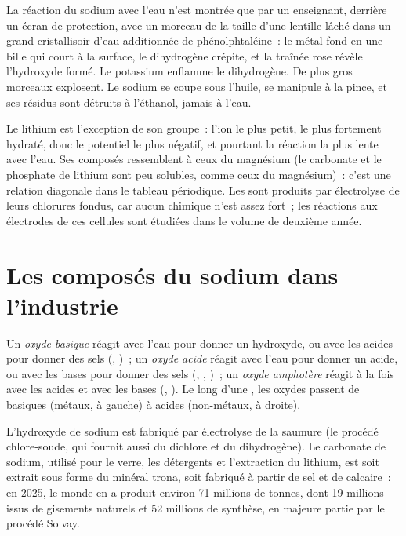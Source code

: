 \begin{inthelab}
La réaction du sodium avec l'eau n'est montrée que par un enseignant,
derrière un écran de protection, avec un morceau de la taille d'une
lentille lâché dans un grand cristallisoir d'eau additionnée de
phénolphtaléine~: le métal fond en une bille qui court à la surface, le
dihydrogène crépite, et la traînée rose révèle l'hydroxyde formé. Le
potassium enflamme le dihydrogène. De plus gros morceaux explosent. Le
sodium se coupe sous l'huile, se manipule à la pince, et ses résidus
sont détruits à l'éthanol, jamais à l'eau.
\end{inthelab}

Le lithium est l'exception de son groupe~: l'ion le plus petit, le plus
fortement hydraté, donc le potentiel le plus négatif, et pourtant la
réaction la plus lente avec l'eau. Ses composés ressemblent à ceux du
magnésium (le carbonate et le phosphate de lithium sont peu solubles,
comme ceux du magnésium)~: c'est une relation diagonale dans le tableau
périodique. Les  sont produits par électrolyse de leurs
chlorures fondus, car aucun  chimique n'est assez fort~; les
réactions aux électrodes de ces cellules sont étudiées dans le volume de
deuxième année.

\section{Les composés du sodium dans l'industrie}

\begin{definition}\label{def:b1:s-block:oxide-character}
Un \emph{oxyde basique} réagit avec l'eau pour
donner un hydroxyde, ou avec les acides pour donner des sels (,
)~; un \emph{oxyde acide} réagit avec l'eau
pour donner un acide, ou avec les bases pour donner des sels (,
, )~; un \emph{oxyde amphotère}
réagit à la fois avec les acides et avec les bases (,
). Le long d'une , les oxydes passent de basiques
(métaux, à gauche) à acides (non-métaux, à droite).
\end{definition}

L'hydroxyde de sodium est fabriqué par électrolyse de la saumure (le
procédé chlore-soude, qui fournit aussi du dichlore et du dihydrogène).
Le carbonate de sodium, utilisé pour le verre, les détergents et
l'extraction du lithium, est soit extrait sous forme du minéral trona,
soit fabriqué à partir de sel et de calcaire~: en 2025, le monde en a
produit environ 71 millions de tonnes, dont 19 millions issus de
gisements naturels et 52 millions de synthèse, en majeure partie par le
procédé Solvay.

